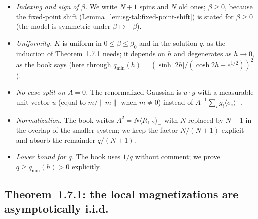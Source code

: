 \begin{remark}
\label{rem:sg-tal:dev-176}
\begin{itemize}
\item \emph{Indexing and sign of $\beta$.}  We write $N+1$ spins and $N$ old ones; $\beta\ge0$, because the fixed-point shift (Lemma~\ref{lem:sg-tal:fixed-point-shift}) is stated for $\beta\ge0$ (the model is symmetric under $\beta\mapsto-\beta$).
\item \emph{Uniformity.}  $K$ is uniform in $0\le\beta\le\beta_0$ and in the solution $q$, as the induction of Theorem~1.7.1 needs; it depends on $h$ and degenerates as $h\to0$, as the book says (here through $q_{\min}(h)=(\sinh|2h|/(\cosh2h+e^{1/2}))^2$).
\item \emph{No case split on $A=0$.}  The renormalized Gaussian is $u\cdot y$ with a measurable unit vector $u$ (equal to $m/\|m\|$ when $m\ne0$) instead of $A^{-1}\sum_ig_i\langle\sigma_i\rangle_-$.
\item \emph{Normalization.}  The book writes $A^2=N\langle R_{1,2}^-\rangle_-$ with $N$ replaced by $N-1$ in the overlap of the smaller system; we keep the factor $N/(N+1)$ explicit and absorb the remainder $q/(N+1)$.
\item \emph{Lower bound for $q$.}  The book uses $1/q$ without comment; we prove $q\ge q_{\min}(h)>0$ explicitly.
\end{itemize}
\end{remark}

\subsection{Theorem~1.7.1: the local magnetizations are asymptotically i.i.d.}
\label{sec:sg-tal:fluct-iid}

